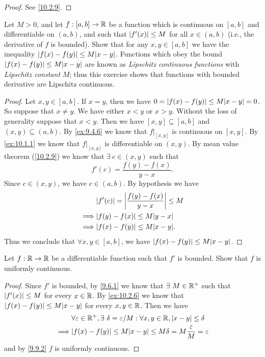 \begin{proof}
  See \cref{10.2.9}.
\end{proof}

\begin{ex}\label{ex:10.2.6}
  Let \(M > 0\), and let \(f : [a, b] \to \mathbb{R}\) be a function which is continuous on \([a, b]\) and differentiable on \((a, b)\), and such that \(\left\lvert f'(x)\right\rvert \leq M\) for all \(x \in (a, b)\) (i.e., the derivative of \(f\) is bounded).
  Show that for any \(x, y \in [a, b]\) we have the inequality \(\abs{f(x) - f(y)} \leq M \abs{x - y}\).
  Functions which obey the bound \(\abs{f(x) - f(y)} \leq M \abs{x - y}\) are known as \emph{Lipschitz continuous functions} with \emph{Lipschitz constant} \(M\);
  thus this exercise shows that functions with bounded derivative are Lipschitz continuous.
\end{ex}

\begin{proof}
  Let \(x, y \in [a, b]\).
  If \(x = y\), then we have \(0 = \abs{f(x) - f(y)} \leq M \abs{x - y} = 0\).
  So suppose that \(x \neq y\).
  We have either \(x < y\) or \(x > y\).
  Without the loss of generality suppose that \(x < y\).
  Then we have \([x, y] \subseteq [a, b]\) and \((x, y) \subseteq (a, b)\).
  By \cref{ex:9.4.6} we know that \(f|_{[x, y]}\) is continuous on \([x, y]\).
  By \cref{ex:10.1.1} we know that \(f|_{[x, y]}\) is differentiable on \((x, y)\).
  By mean value theorem (\cref{10.2.9}) we know that \(\exists\ c \in (x, y)\) such that
  \[
    f'(c) = \dfrac{f(y) - f(x)}{y - x}.
  \]
  Since \(c \in (x, y)\), we have \(c \in (a, b)\).
  By hypothesis we have
  \begin{align*}
             & \abs{f'(c)} = \abs{\dfrac{f(y) - f(x)}{y - x}} \leq M \\
    \implies & \abs{f(y) - f(x)} \leq M \abs{y - x}                  \\
    \implies & \abs{f(x) - f(y)} \leq M \abs{x - y}.
  \end{align*}
  Thus we conclude that \(\forall x, y \in [a, b]\), we have \(\abs{f(x) - f(y)} \leq M \abs{x - y}\).
\end{proof}

\begin{ex}\label{ex:10.2.7}
  Let \(f : \mathbb{R} \to \mathbb{R}\) be a differentiable function such that \(f'\) is bounded.
  Show that \(f\) is uniformly continuous.
\end{ex}

\begin{proof}
  Since \(f'\) is bounded, by \cref{9.6.1} we know that \(\exists\ M \in \mathbb{R}^+\) such that \(\left\lvert f'(x)\right\rvert \leq M\) for every \(x \in \mathbb{R}\).
  By \cref{ex:10.2.6} we know that \(\abs{f(x) - f(y)} \leq M \abs{x - y}\) for every \(x, y \in \mathbb{R}\).
  Then we have
  \begin{align*}
             & \forall \varepsilon \in \R^+, \exists\ \delta = \varepsilon / M : \forall x, y \in \R, \abs{x - y} \leq \delta \\
    \implies & \abs{f(x) - f(y)} \leq M \abs{x - y} \leq M \delta = M \dfrac{\varepsilon}{M} = \varepsilon
  \end{align*}
  and by \cref{9.9.2} \(f\) is uniformly continuous.
\end{proof}